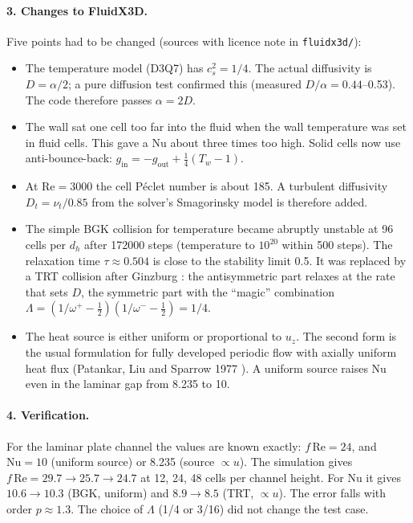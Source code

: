 \paragraph{3. Changes to FluidX3D.} Five points had to be changed (sources with licence note in
\texttt{fluidx3d/}):
\begin{itemize}
\item The temperature model (D3Q7) has $c_s^2 = 1/4$. The actual diffusivity is $D = \alpha/2$; a pure diffusion
  test confirmed this (measured $D/\alpha = 0.44$--0.53). The code therefore passes $\alpha = 2D$.
\item The wall sat one cell too far into the fluid when the wall temperature was set in fluid cells. This gave a
  Nu about three times too high. Solid cells now use anti-bounce-back: $g_\text{in} = -g_\text{out} +
  \tfrac14(T_w - 1)$.
\item At $\mathrm{Re}=3000$ the cell Péclet number is about 185. A turbulent diffusivity $D_t = \nu_t/0.85$ from the
  solver's Smagorinsky model is therefore added.
\item The simple BGK collision for temperature became abruptly unstable at 96 cells per $d_h$ after \num{172000} steps
  (temperature to $10^{20}$ within 500 steps). The relaxation time $\tau \approx 0.504$ is close to the stability
  limit 0.5. It was replaced by a TRT collision after Ginzburg \cite{ginzburg2005}: the antisymmetric part relaxes at the rate that sets
  $D$, the symmetric part with the ``magic'' combination
  $\Lambda = (1/\omega^+ - \tfrac12)(1/\omega^- - \tfrac12) = 1/4$.
\item The heat source is either uniform or proportional to $u_z$. The second form is the usual formulation for
  fully developed periodic flow with axially uniform heat flux (Patankar, Liu and Sparrow 1977 \cite{patankar1977}). A uniform source
  raises Nu even in the laminar gap from 8.235 to 10.
\end{itemize}

\paragraph{4. Verification.} For the laminar plate channel the values are known exactly: $f\,\mathrm{Re}=24$, and
$\mathrm{Nu}=10$ (uniform source) or 8.235 (source $\propto u$). The simulation gives $f\,\mathrm{Re} = 29.7 \to 25.7
\to 24.7$ at 12, 24, 48 cells per channel height. For Nu it gives $10.6 \to 10.3$ (BGK, uniform) and
$8.9 \to 8.5$ (TRT, $\propto u$). The error falls with order $p \approx 1.3$. The choice of $\Lambda$ (1/4 or 3/16)
did not change the test case.


